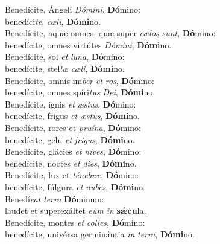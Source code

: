 \evenverse Benedícite, Ángeli \textit{Dó}\textit{mi}\textit{ni}, \textbf{Dó}mino:~\*\\
\evenverse benedíci\textit{te}, \textit{cæ}\textit{li}, \textbf{Dó}\textbf{mi}no.\\
\oddverse Benedícite, aquæ omnes, quæ super \textit{cæ}\textit{los} \textit{sunt}, \textbf{Dó}mino:~\*\\
\oddverse benedícite, omnes virtútes \textit{Dó}\textit{mi}\textit{ni}, \textbf{Dó}\textbf{mi}no.\\
\evenverse Benedícite, sol \textit{et} \textit{lu}\textit{na}, \textbf{Dó}mino:~\*\\
\evenverse benedícite, stel\textit{læ} \textit{cæ}\textit{li}, \textbf{Dó}\textbf{mi}no.\\
\oddverse Benedícite, omnis im\textit{ber} \textit{et} \textit{ros}, \textbf{Dó}mino:~\*\\
\oddverse benedícite, omnes spíri\textit{tus} \textit{De}\textit{i}, \textbf{Dó}\textbf{mi}no.\\
\evenverse Benedícite, ignis \textit{et} \textit{æ}\textit{stus}, \textbf{Dó}mino:~\*\\
\evenverse benedícite, frigus \textit{et} \textit{æ}\textit{stus}, \textbf{Dó}\textbf{mi}no.\\
\oddverse Benedícite, rores et \textit{pru}\textit{í}\textit{na}, \textbf{Dó}mino:~\*\\
\oddverse benedícite, gelu \textit{et} \textit{fri}\textit{gus}, \textbf{Dó}\textbf{mi}no.\\
\evenverse Benedícite, glácies \textit{et} \textit{ni}\textit{ves}, \textbf{Dó}mino:~\*\\
\evenverse benedícite, noctes \textit{et} \textit{di}\textit{es}, \textbf{Dó}\textbf{mi}no.\\
\oddverse Benedícite, lux et \textit{té}\textit{ne}\textit{bræ}, \textbf{Dó}mino:~\*\\
\oddverse benedícite, fúlgura \textit{et} \textit{nu}\textit{bes}, \textbf{Dó}\textbf{mi}no.\\
\evenverse Benedí\textit{cat} \textit{ter}\textit{ra} \textbf{Dó}minum:~\*\\
\evenverse laudet et superexáltet \textit{e}\textit{um} \textit{in} \textbf{sǽ}\textbf{cu}la.\\
\oddverse Benedícite, montes \textit{et} \textit{col}\textit{les}, \textbf{Dó}mino:~\*\\
\oddverse benedícite, univérsa germinántia \textit{in} \textit{ter}\textit{ra}, \textbf{Dó}\textbf{mi}no.\\
